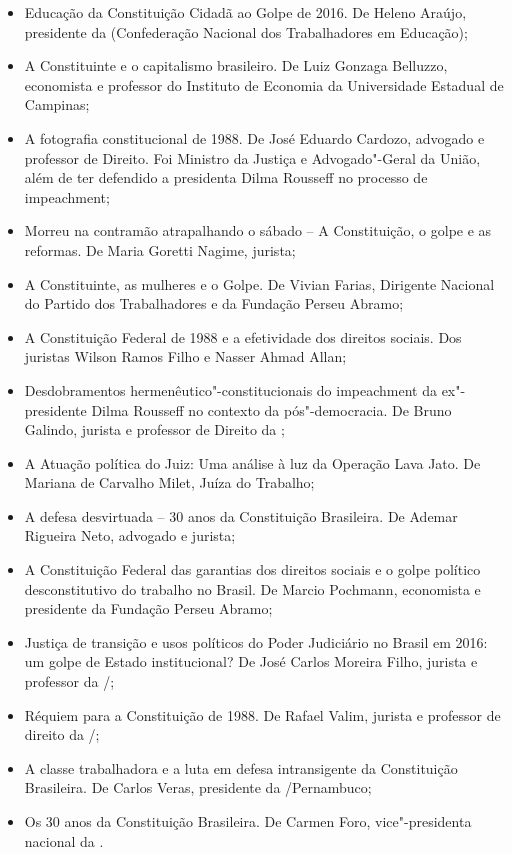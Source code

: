 \begin{itemize}
\item Educação da Constituição Cidadã ao Golpe de 2016. De
Heleno Araújo, presidente da  (Confederação Nacional dos Trabalhadores em Educação);
\item A Constituinte e o capitalismo brasileiro. De Luiz Gonzaga Belluzzo, economista e
professor do Instituto de Economia da Universidade Estadual de Campinas;
\item A fotografia constitucional de 1988. De José
Eduardo Cardozo, advogado e professor de Direito. Foi Ministro da Justiça e Advogado"-Geral da
União, além de ter defendido a presidenta Dilma Rousseff no processo de impeachment;
\item Morreu na contramão atrapalhando o sábado -- A Constituição, o golpe e as
reformas. De Maria Goretti Nagime, jurista;
\item A Constituinte, as mulheres e o Golpe. De Vivian Farias, Dirigente Nacional do Partido dos
Trabalhadores e da Fundação Perseu Abramo;
\item A Constituição Federal de 1988 e a efetividade dos direitos sociais. Dos
juristas Wilson Ramos Filho e Nasser Ahmad Allan;
\item Desdobramentos hermenêutico"-constitucionais do impeachment da ex"-presidente Dilma
Rousseff no contexto da pós"-democracia. De Bruno Galindo, jurista e professor de Direito da
;
\item A Atuação política do Juiz: Uma análise à luz da Operação Lava Jato. De Mariana
de Carvalho Milet, Juíza do Trabalho;
\item A defesa desvirtuada -- 30 anos da Constituição Brasileira. De Ademar Rigueira
Neto, advogado e jurista;
\item A Constituição Federal das garantias dos direitos sociais e o golpe político
desconstitutivo do trabalho no Brasil. De Marcio Pochmann, economista e presidente
da Fundação Perseu Abramo;
\item Justiça de transição e usos políticos do Poder Judiciário
no Brasil em 2016: um golpe de Estado institucional? De José Carlos Moreira Filho, jurista e
professor da /;
\item Réquiem para a
Constituição de 1988. De Rafael Valim, jurista e professor de direito da /;
\item A classe trabalhadora e a luta em defesa
intransigente da Constituição Brasileira. De Carlos Veras, presidente da /Pernambuco;
\item Os 30 anos da Constituição Brasileira. De
Carmen Foro, vice"-presidenta nacional da .
\end{itemize}

